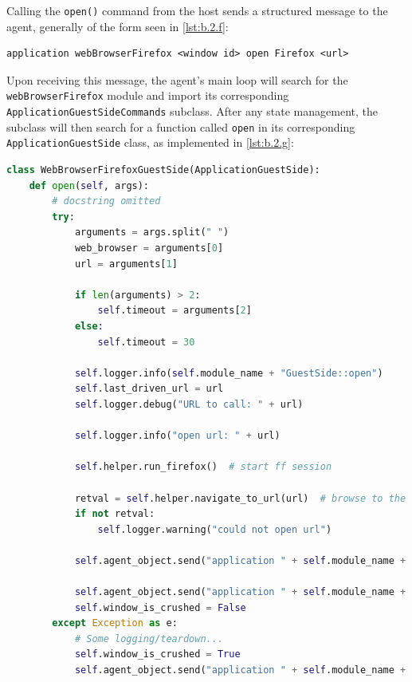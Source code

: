 \documentclass[letterpaper,12pt]{report}
\newcommand{\passthrough}[1]{#1}
\begin{document}
Calling the \passthrough{\lstinline!open()!} command from the host sends
a structured message to the agent, generally of the form seen in
\autoref{lst:b.2.f}:

\begin{lstlisting}[label={lst:b.2.f}, caption={Sample ForTrace agent protocol message}, ]
application webBrowserFirefox <window id> open Firefox <url>
\end{lstlisting}

Upon receiving this message, the agent's main loop will search for the
\passthrough{\lstinline!webBrowserFirefox!} module and import its
corresponding \passthrough{\lstinline!ApplicationGuestSideCommands!}
subclass. After any state management, the subclass will then search for
a function called \passthrough{\lstinline!open!} in its corresponding
\passthrough{\lstinline!ApplicationGuestSide!} class, as implemented in
\autoref{lst:b.2.g}:

\begin{lstlisting}[label={lst:b.2.g}, caption={Corresponding ForTrace agent-side call }, language=Python]
class WebBrowserFirefoxGuestSide(ApplicationGuestSide):
    def open(self, args):
        # docstring omitted
        try:
            arguments = args.split(" ")
            web_browser = arguments[0]
            url = arguments[1]

            if len(arguments) > 2:
                self.timeout = arguments[2]
            else:
                self.timeout = 30

            self.logger.info(self.module_name + "GuestSide::open")
            self.last_driven_url = url
            self.logger.debug("URL to call: " + url)

            self.logger.info("open url: " + url)

            self.helper.run_firefox()  # start ff session

            retval = self.helper.navigate_to_url(url)  # browse to the specified url
            if not retval:
                self.logger.warning("could not open url")

            self.agent_object.send("application " + self.module_name + " " + str(self.window_id) + " opened")

            self.agent_object.send("application " + self.module_name + " " + str(self.window_id) + " ready")
            self.window_is_crushed = False
        except Exception as e:
            # Some logging/teardown...
            self.window_is_crushed = True
            self.agent_object.send("application " + self.module_name + " " + str(self.window_id) + " error")
\end{lstlisting}
\end{document}
